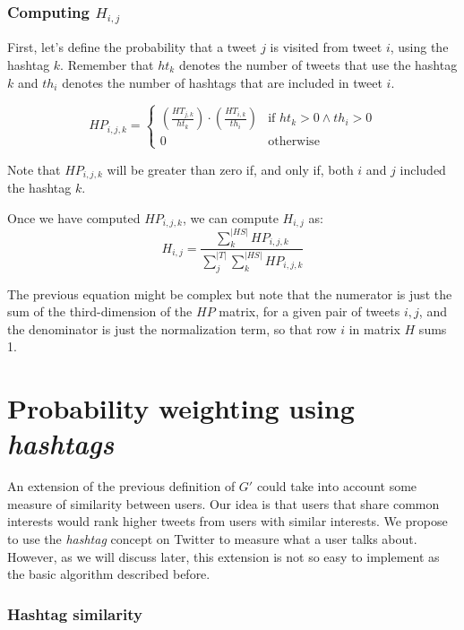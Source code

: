 \documentclass[12pt,a4paper]{article}
\begin{document}
\subsubsection*{Computing $H_{i,j}$}
First, let's define the probability that a tweet $j$ is visited from tweet $i$, using the hashtag $k$. Remember that $ht_k$ denotes the number of tweets that use the hashtag $k$ and $th_i$ denotes the number of hashtags that are included in tweet $i$.

\begin{equation}
HP_{i,j,k} = \begin{cases}
\left( \frac{ HT_{j,k} }{ ht_k } \right) \cdot \left( \frac{ HT_{i,k} }{ th_i } \right) & \text{if } ht_k > 0 \wedge th_i > 0 \\
0 & \text{otherwise}
\end{cases}
\end{equation}

Note that $HP_{i,j,k}$ will be greater than zero if, and only if, both $i$ and $j$ included the hashtag $k$. 

Once we have computed $HP_{i,j,k}$, we can compute $H_{i,j}$ as:
\begin{equation}
H_{i,j} = \frac{\sum^{|HS|}_{k} HP_{i,j,k}}{ \sum^{|T|}_j \sum^{|HS|}_{k} HP_{i,j,k}}
\end{equation}

The previous equation might be complex but note that the numerator is just the sum of the third-dimension of the $HP$ matrix, for a given pair of tweets $i, j$, and the denominator is just the normalization term, so that row $i$ in matrix $H$ sums 1.


\section{Probability weighting using \emph{hashtags}}
An extension of the previous definition of $G'$ could take into account some measure of similarity between users. Our idea is that users that share common interests would rank higher tweets from users with similar interests. We propose to use the \emph{hashtag} concept on Twitter to measure what a user talks about. However, as we will discuss later, this extension is not so easy to implement as the basic algorithm described before.

\subsubsection*{Hashtag similarity}
\end{document}

